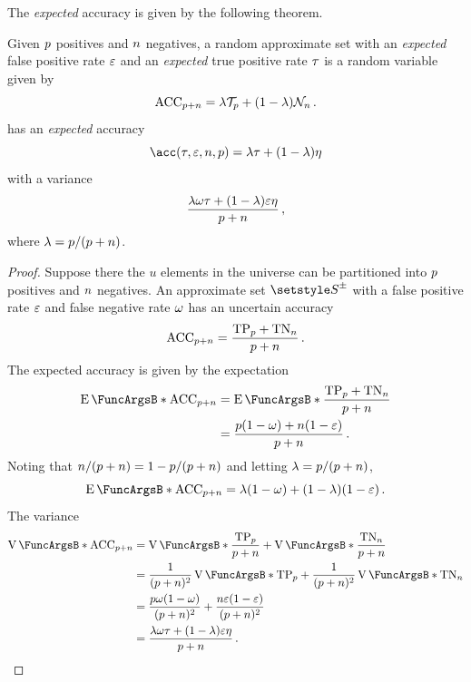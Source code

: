 \documentclass[10pt,final,hidelinks]{article}
\numberwithin{equation}{section}
\begin{document}
The \emph{expected} accuracy is given by the following theorem.
\begin{theorem}
	\label{thm:approx_expected_accuracy}
	Given $p$ positives and $n$ negatives, a random approximate set with an 
	\emph{expected} false positive rate $\varepsilon$ and an \emph{expected} true 
	positive rate $\tau$ is a random variable given by
	\begin{equation}
	\mathrm{ACC}_{p + n} = \lambda \mathcal{T}_p + (1 - \lambda) \mathcal{N}_n\,.
	\end{equation}	
	has an \emph{expected} accuracy
	\begin{equation}
	\label{eq:approx_expected_accuracy}
	\acc(\tprate,\fprate,\n,\p) = \lambda \tprate + (1-\lambda) \tnrate
	\end{equation}
	with a variance
	\begin{equation}
	\frac{\lambda \omega \tau + (1 - \lambda)\varepsilon 
		\eta}{p+n}\,,   
	\end{equation}
	where $\lambda = p / (p + n)$.
\end{theorem}
\begin{proof}
	Suppose there the $u$ elements in the universe can be partitioned into $p$ 
	positives and $n$ negatives. An approximate set $\ASet{S}$ with a false 
	positive rate $\varepsilon$ and false negative rate $\omega$ has an uncertain 
	accuracy
	\begin{equation}
	\mathrm{ACC}_{p + n} = \frac{\mathrm{TP}_p + \mathrm{TN}_n}{p + n}\,.
	\end{equation}
	The expected accuracy is given by the expectation
	\begin{align}
	\Expect{\ACC_{\p + \n}}
	&= \Expect{\frac{\TP_\p + \TN_\n}{\p + \n}}\\
	&= \frac{\p (1 - \fnrate) + \n (1 - \fprate)}{\p + \n}\,.
	\end{align}
	Noting that $n/(p+n) = 1 - p/(p+n)$ and letting $\lambda = p/(p + 
	n)$,
	\begin{equation}
	\Expect{\ACC_{\p + \n}} = \lambda (1 - \fnrate) + (1 - \lambda) (1 - 
	\fprate)\,.
	\end{equation}
	The variance
	\begin{align}
	\Var{\ACC_{\p + \n}}
	&= \Var{\frac{\TP_\p}{\p + \n}} + \Var{\frac{\TN_\n}{\p + \n}}\\
	&= \frac{1}{(\p + \n)^2}\Var{\TP_\p} + \frac{1}{(\p + \n)^2}\Var{\TN_\n}\\
	&= \frac{\p \fnrate (1 - \fnrate)}{(\p + \n)^2} + \frac{\n \fprate (1 - 
		\fprate)}{(\p + \n)^2}\\
	&= \frac{\lambda \fnrate \tprate + (1 - \lambda)\fprate 
		\tnrate}{\p+\n}\,.
	\end{align}
\end{proof}
\end{document}
